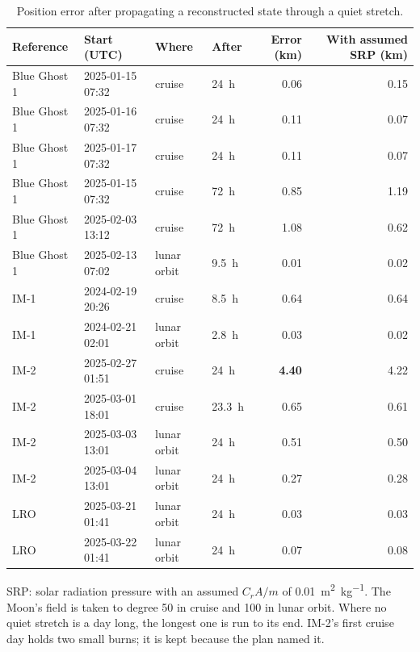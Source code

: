 \documentclass[11pt,a4paper]{article}
\begin{document}
\begin{table}[htbp]
\centering\small
\caption{Position error after propagating a reconstructed state through a quiet stretch.}
\label{tab:prop}
\begin{tabular}{@{}llllrr@{}}
\toprule
Reference & Start (UTC) & Where & After & Error (\unit{\km}) & With assumed SRP (\unit{\km}) \\
\midrule
Blue Ghost 1 & 2025-01-15 07:32 & cruise & \qty{24}{\hour} & 0.06 & 0.15 \\
Blue Ghost 1 & 2025-01-16 07:32 & cruise & \qty{24}{\hour} & 0.11 & 0.07 \\
Blue Ghost 1 & 2025-01-17 07:32 & cruise & \qty{24}{\hour} & 0.11 & 0.07 \\
Blue Ghost 1 & 2025-01-15 07:32 & cruise & \qty{72}{\hour} & 0.85 & 1.19 \\
Blue Ghost 1 & 2025-02-03 13:12 & cruise & \qty{72}{\hour} & 1.08 & 0.62 \\
Blue Ghost 1 & 2025-02-13 07:02 & lunar orbit & \qty{9.5}{\hour} & 0.01 & 0.02 \\
IM-1 & 2024-02-19 20:26 & cruise & \qty{8.5}{\hour} & 0.64 & 0.64 \\
IM-1 & 2024-02-21 02:01 & lunar orbit & \qty{2.8}{\hour} & 0.03 & 0.02 \\
IM-2 & 2025-02-27 01:51 & cruise & \qty{24}{\hour} & \textbf{4.40} & 4.22 \\
IM-2 & 2025-03-01 18:01 & cruise & \qty{23.3}{\hour} & 0.65 & 0.61 \\
IM-2 & 2025-03-03 13:01 & lunar orbit & \qty{24}{\hour} & 0.51 & 0.50 \\
IM-2 & 2025-03-04 13:01 & lunar orbit & \qty{24}{\hour} & 0.27 & 0.28 \\
LRO & 2025-03-21 01:41 & lunar orbit & \qty{24}{\hour} & 0.03 & 0.03 \\
LRO & 2025-03-22 01:41 & lunar orbit & \qty{24}{\hour} & 0.07 & 0.08 \\
\bottomrule
\end{tabular}
\par\smallskip\footnotesize SRP: solar radiation pressure with an assumed
$C_r A/m$ of \qty{0.01}{\m\squared\per\kg}. The Moon's field is taken to degree 50 in
cruise and 100 in lunar orbit. Where no quiet stretch is a day long, the longest one is run
to its end. IM-2's first cruise day holds two small burns; it is kept because the plan
named it.
\end{table}
\end{document}
